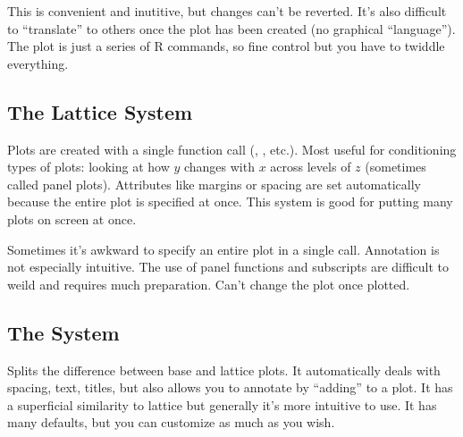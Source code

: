 This is convenient and inutitive, but changes can't be reverted. It's also difficult to ``translate'' to others once the plot has been created (no graphical ``language''). The plot is just a series of R commands, so fine control but you have to twiddle everything.

\subsection*{The Lattice System}
Plots are created with a single function call (, , etc.). Most useful for conditioning types of plots: looking at how $y$ changes with $x$ across levels of $z$ (sometimes called panel plots). Attributes like margins or spacing are set automatically because the entire plot is specified at once. This system is good for putting many plots on screen at once.

Sometimes it's awkward to specify an entire plot in a single call. Annotation is not especially intuitive. The use of panel functions and subscripts are difficult to weild and requires much preparation. Can't change the plot once plotted.

\subsection*{The  System}
Splits the difference between base and lattice plots. It automatically deals with spacing, text, titles, but also allows you to annotate by ``adding'' to a plot. It has a superficial similarity to lattice but generally it's more intuitive to use. It has many defaults, but you can customize as much as you wish.
